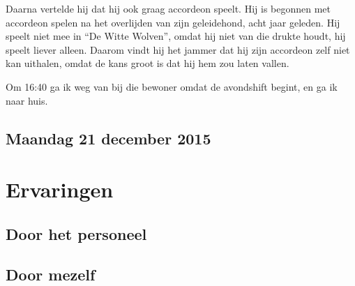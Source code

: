 \documentclass[a4paper,12pt]{article}
\begin{document}
Daarna vertelde hij dat hij ook graag accordeon speelt. Hij is begonnen met accordeon spelen na het overlijden van zijn geleidehond, acht jaar geleden. Hij speelt niet mee in ``De Witte Wolven'', omdat hij niet van die drukte houdt, hij speelt liever alleen. Daarom vindt hij het jammer dat hij zijn accordeon zelf niet kan uithalen, omdat de kans groot is dat hij hem zou laten vallen.

Om 16:40 ga ik weg van bij die bewoner omdat de avondshift begint, en ga ik naar huis.

\subsection{Maandag 21 december 2015}

\section{Ervaringen}

\subsection{Door het personeel}

\subsection{Door mezelf}
\end{document}
